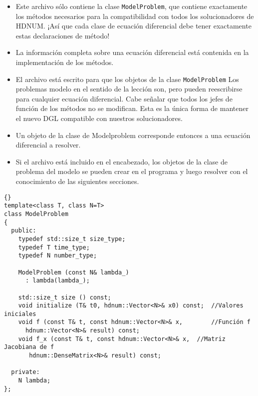 \begin{itemize}
\item Este archivo sólo contiene la clase
  \lstinline{ModelProblem}, que contiene exactamente los métodos necesarios para la compatibilidad con todos los solucionadores de HDNUM. ¡Así que cada clase de ecuación diferencial debe tener exactamente estas declaraciones de método!
\item La información completa sobre una ecuación diferencial está contenida en la implementación de los métodos.
\item El archivo está escrito para que los objetos de la clase
  \lstinline{ModelProblem} Los problemas modelo en el sentido de la lección son, pero pueden reescribirse para cualquier ecuación diferencial. Cabe señalar que todos los jefes de función de los métodos no se modifican. Esta es la única forma de mantener el nuevo DGL compatible con nuestros solucionadores.
\item Un objeto de la clase de Modelproblem corresponde entonces a una ecuación diferencial a resolver.
\item Si el archivo está incluido en el encabezado, los objetos de la clase de problema del modelo se pueden crear en el programa y luego resolver con el conocimiento de las siguientes secciones.
\end{itemize}

{\footnotesize{\begin{lstlisting}{}
template<class T, class N=T>
class ModelProblem
{
  public:
    typedef std::size_t size_type;
    typedef T time_type;
    typedef N number_type;

    ModelProblem (const N& lambda_)
      : lambda(lambda_);

    std::size_t size () const;
    void initialize (T& t0, hdnum::Vector<N>& x0) const;  //Valores iniciales
    void f (const T& t, const hdnum::Vector<N>& x,        //Función f
      hdnum::Vector<N>& result) const;
    void f_x (const T& t, const hdnum::Vector<N>& x,  //Matriz Jacobiana de f
       hdnum::DenseMatrix<N>& result) const;

  private:
    N lambda;
};
\end{lstlisting}}}


